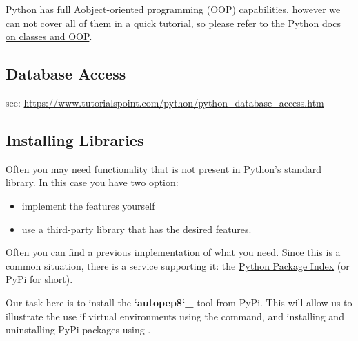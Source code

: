 \begin{sphinxVerbatim}[commandchars=\\\{\}]
         
                    

       
\end{sphinxVerbatim}

Python has full Aobject-oriented programming (OOP) capabilities,
however we can not cover all of them in a quick tutorial, so please
refer to the \href{https://docs.python.org/2.7/tutorial/classes.html}{Python docs on classes and OOP}.


\subsection{Database Access}
\label{\detokenize{lesson/prg/python_intro:database-access}}
see: \url{https://www.tutorialspoint.com/python/python\_database\_access.htm}


\subsection{Installing Libraries}
\label{\detokenize{lesson/prg/python_intro:installing-libraries}}
Often you may need functionality that is not present in Python's
standard library.  In this case you have two option:
\begin{itemize}
\item {} 
implement the features yourself

\item {} 
use a third-party library that has the desired features.

\end{itemize}

Often you can find a previous implementation of what you need.
Since this is a common situation, there is a service supporting it:
the \href{https://pypi.python.org/pypi}{Python Package Index} (or PyPi for short).

Our task here is to install the {\color{red}\bfseries{}{}`autopep8{}`\_} tool from PyPi.  This will
allow us to illustrate the use if virtual environments using the
 command, and installing and uninstalling PyPi packages
using .


